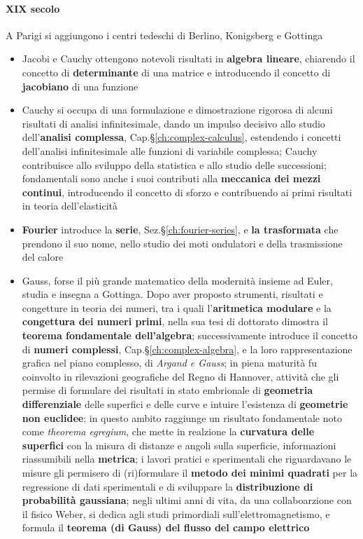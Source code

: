 \paragraph{XIX secolo}
A Parigi si aggiungono i centri tedeschi di Berlino, Konigsberg e Gottinga
\begin{itemize}
    \item Jacobi e Cauchy ottengono notevoli risultati in \textbf{algebra lineare}, chiarendo il concetto di \textbf{determinante} di una matrice e introducendo il concetto di \textbf{jacobiano} di una funzione
    \item Cauchy si occupa di una formulazione e dimostrazione rigorosa di alcuni risultati di analisi infinitesimale, dando un impulso decisivo allo studio dell'\textbf{analisi complessa}, Cap.\S\ref{ch:complex-calculus}, estendendo i concetti dell'analisi infinitesimale alle funzioni di variabile complessa; Cauchy contribuisce allo sviluppo della statistica e allo studio delle successioni; fondamentali sono anche i suoi contributi alla \textbf{meccanica dei mezzi continui}, introducendo il concetto di sforzo e contribuendo ai primi risultati in teoria dell'elasticità
    \item \textbf{Fourier} introduce la \textbf{serie}, Sez.\S\ref{ch:fourier-series}, e \textbf{la trasformata} che prendono il suo nome, nello studio dei moti ondulatori e della trasmissione del calore
    \item Gauss, forse il più grande matematico della modernità insieme ad Euler, studia e insegna a Gottinga. Dopo aver proposto strumenti, risultati e congetture in teoria dei numeri, tra i quali l'\textbf{aritmetica modulare} e la \textbf{congettura dei numeri primi}, nella sua tesi di dottorato dimostra il \textbf{teorema fondamentale dell'algebra}; successivamente introduce il concetto di \textbf{numeri complessi}, Cap.\S\ref{ch:complex-algebra}, e la loro rappresentazione grafica nel piano complesso, di \textit{Argand e Gauss}; in piena maturità fu coinvolto in rilevazioni geografiche del Regno di Hannover, attività che gli permise di formulare dei risultati in stato embrionale di \textbf{geometria differenziale} delle superfici e delle curve e intuire l'esistenza di \textbf{geometrie non euclidee}: in questo ambito raggiunge un risultato fondamentale noto come \textit{theorema egregium}, che mette in realzione la \textbf{curvatura delle superfici} con la misura di distanze e angoli sulla superficie, informazioni riassumibili nella \textbf{metrica}; i lavori pratici e sperimentali che riguardavano le misure gli permisero di (ri)formulare il \textbf{metodo dei minimi quadrati} per la regressione di dati sperimentali e di sviluppare la \textbf{distribuzione di probabilità gaussiana}; negli ultimi anni di vita, da una collaboarzione con il fisico Weber, si dedica agli studi primordiali sull'elettromagnetismo, e formula il \textbf{teorema (di Gauss) del flusso del campo elettrico}

\end{itemize}
